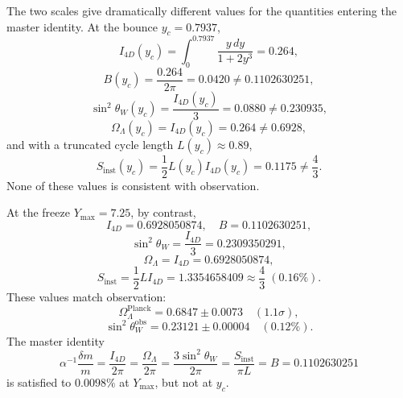\documentclass[a4paper,1pt,oneside,openany]{book}
\begin{document}
The two scales give dramatically different values for the quantities entering the master identity. At the bounce $y_c = 0.7937$,
\begin{equation}
I_{4D}(y_c) = \int_0^{0.7937} \frac{y\,dy}{1 + 2y^3} = 0.264,
\label{eq:I4D-yc}
\end{equation}
\begin{equation}
B(y_c) = \frac{0.264}{2\pi} = 0.0420 \neq 0.1102630251,
\label{eq:B-yc}
\end{equation}
\begin{equation}
\sin^2\theta_W(y_c) = \frac{I_{4D}(y_c)}{3} = 0.0880 \neq 0.230935,
\label{eq:sin2-yc}
\end{equation}
\begin{equation}
\Omega_\Lambda(y_c) = I_{4D}(y_c) = 0.264 \neq 0.6928,
\label{eq:OmegaL-yc}
\end{equation}
and with a truncated cycle length $L(y_c) \approx 0.89$,
\begin{equation}
S_{\mathrm{inst}}(y_c) = \frac{1}{2}L(y_c)I_{4D}(y_c) = 0.1175 \neq \frac{4}{3}.
\label{eq:Sinst-yc}
\end{equation}
None of these values is consistent with observation.

At the freeze $Y_{\max} = 7.25$, by contrast,
\begin{equation}
I_{4D} = 0.6928050874, \quad B = 0.1102630251,
\label{eq:I4D-B-Ymax}
\end{equation}
\begin{equation}
\sin^2\theta_W = \frac{I_{4D}}{3} = 0.2309350291,
\label{eq:sin2-Ymax}
\end{equation}
\begin{equation}
\Omega_\Lambda = I_{4D} = 0.6928050874,
\label{eq:OmegaL-Ymax}
\end{equation}
\begin{equation}
S_{\mathrm{inst}} = \frac{1}{2}LI_{4D} = 1.3354658409 \approx \frac{4}{3}\;(0.16\%).
\label{eq:Sinst-Ymax}
\end{equation}
These values match observation:
\begin{equation}
\Omega_\Lambda^{\mathrm{Planck}} = 0.6847 \pm 0.0073 \quad (1.1\sigma),
\label{eq:OmegaL-obs}
\end{equation}
\begin{equation}
\sin^2\theta_W^{\mathrm{obs}} = 0.23121 \pm 0.00004 \quad (0.12\%).
\label{eq:sin2-obs}
\end{equation}
The master identity
\begin{equation}
\boxed{\alpha^{-1}\frac{\delta m}{m} = \frac{I_{4D}}{2\pi} = \frac{\Omega_\Lambda}{2\pi} = \frac{3\sin^2\theta_W}{2\pi} = \frac{S_{\mathrm{inst}}}{\pi L} = B = 0.1102630251}
\label{eq:master-lock}
\end{equation}
is satisfied to $0.0098\%$ at $Y_{\max}$, but not at $y_c$.
\end{document}
